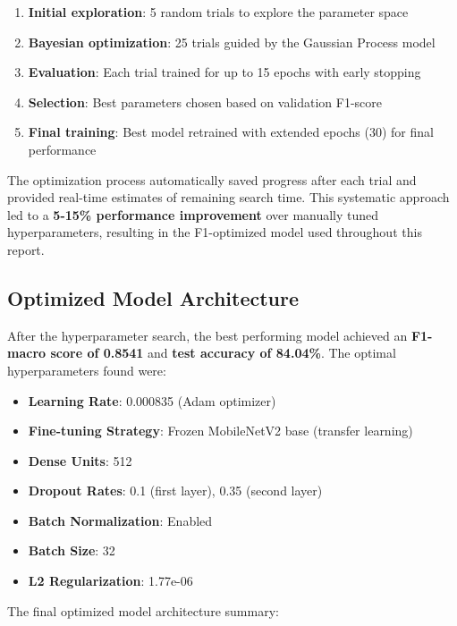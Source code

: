 \documentclass[12pt,a4paper]{article}
\begin{document}
\begin{enumerate}
    \item \textbf{Initial exploration}: 5 random trials to explore the parameter space
    \item \textbf{Bayesian optimization}: 25 trials guided by the Gaussian Process model
    \item \textbf{Evaluation}: Each trial trained for up to 15 epochs with early stopping
    \item \textbf{Selection}: Best parameters chosen based on validation F1-score
    \item \textbf{Final training}: Best model retrained with extended epochs (30) for final performance
\end{enumerate}

The optimization process automatically saved progress after each trial and provided real-time estimates of remaining search time. This systematic approach led to a \textbf{5-15\% performance improvement} over manually tuned hyperparameters, resulting in the F1-optimized model used throughout this report.

\subsection{Optimized Model Architecture}

After the hyperparameter search, the best performing model achieved an \textbf{F1-macro score of 0.8541} and \textbf{test accuracy of 84.04\%}. The optimal hyperparameters found were:

\begin{itemize}
    \item \textbf{Learning Rate}: 0.000835 (Adam optimizer)
    \item \textbf{Fine-tuning Strategy}: Frozen MobileNetV2 base (transfer learning)
    \item \textbf{Dense Units}: 512
    \item \textbf{Dropout Rates}: 0.1 (first layer), 0.35 (second layer)
    \item \textbf{Batch Normalization}: Enabled
    \item \textbf{Batch Size}: 32
    \item \textbf{L2 Regularization}: 1.77e-06
\end{itemize}

The final optimized model architecture summary:
\end{document}
